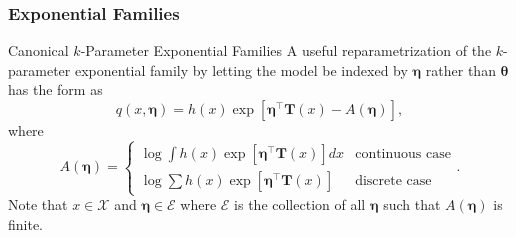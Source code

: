 \documentclass[serif,mathserif,professionalfont]{beamer}
\begin{document}
\begin{frame}
	
	\frametitle{Exponential Families}
	
	\begin{block}{Canonical $ k $-Parameter Exponential Families}
		A useful reparametrization of the $ k $-parameter exponential family by letting the model be indexed by $ \boldsymbol{\eta} $ rather than $ \boldsymbol{\theta} $ has the form as
		\begin{equation*}
		q\left(x, \boldsymbol{\eta} \right) = h\left(x \right) \exp \left[\boldsymbol{\eta}^\top \bm{T}\left(x \right) - A\left(\boldsymbol{\eta} \right) \right],
		\end{equation*}
		where
		\begin{equation*}
		A\left(\boldsymbol{\eta} \right) = 
		\begin{cases}
		\displaystyle \log \int h\left(x \right) \exp \left[\boldsymbol{\eta}^\top \bm{T}\left(x \right) \right] dx  & \text{continuous case} \\
		\displaystyle \log \sum h\left(x \right) \exp \left[\boldsymbol{\eta}^\top \bm{T}\left(x \right) \right]  & \text{discrete case}
		\end{cases}.
		\end{equation*}
		Note that $ x \in \mathcal{X} $ and $ \boldsymbol{\eta} \in \mathcal{E} $ where $ \mathcal{E} $ is the collection of all $ \boldsymbol{\eta} $ such that $ A\left(\boldsymbol{\eta} \right) $ is finite.
	\end{block}
	
\end{frame}
\end{document}
